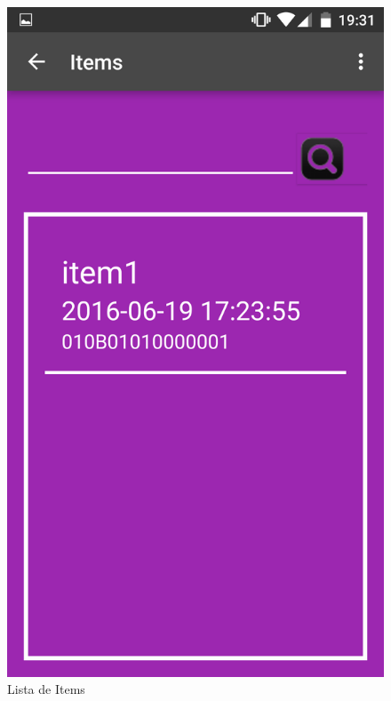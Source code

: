 \documentclass[a4paper,11pt]{book}
\begin{document}
\begin{figure}[H]
  \includegraphics[width=\linewidth]{imagenes/pruebas/movil/movil2.png}
  \caption{Lista de Items\cite{propio}}
\endminipage\hfill
\end{figure}
\end{document}
